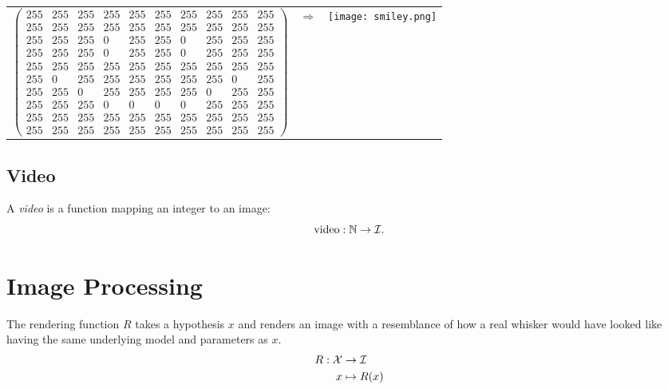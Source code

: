 \begin{example}~\\
  \begin{tabular}{lcr}
    $
    \begin{pmatrix} 
      255&  255&  255&  255&  255&  255&  255&  255&  255&  255\\
      255&  255&  255&  255&  255&  255&  255&  255&  255&  255\\
      255&  255&  255&    0&  255&  255&    0&  255&  255&  255\\
      255&  255&  255&    0&  255&  255&    0&  255&  255&  255\\
      255&  255&  255&  255&  255&  255&  255&  255&  255&  255\\
      255&    0&  255&  255&  255&  255&  255&  255&    0&  255\\
      255&  255&    0&  255&  255&  255&  255&    0&  255&  255\\
      255&  255&  255&    0&    0&    0&    0&  255&  255&  255\\
      255&  255&  255&  255&  255&  255&  255&  255&  255&  255\\
      255&  255&  255&  255&  255&  255&  255&  255&  255&  255
    \end{pmatrix}$
    &$\Rightarrow$& \parbox[c]{1em}{\texttt{[image: smiley.png]}}
    \end{tabular}
\end{example}

\subsection{Video}
\begin{definition}
  A \emph{video} is a function mapping an integer to an image:
  \begin{equation}
    \text{video} : \mathbb{N} \rightarrow \mathcal{I}.
  \end{equation}
\end{definition}

\section{Image Processing}

\begin{definition}
 \label{def:hypothesis_render}
  The rendering function $R$ takes a hypothesis $x$ and renders an
  image with a resemblance of how a real whisker would have looked
  like having the same underlying model and parameters as $x$.
  \begin{equation}
    \begin{split}
      R : \mathcal{X} &\rightarrow \mathcal{I}\\
      x &\mapsto R(x)
    \end{split}
  \end{equation}
\end{definition}


